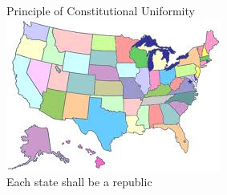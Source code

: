 \begin{frame}{Principle of Constitutional Uniformity}
    \centering
    \includegraphics[height=.7\textheight]{img/us-map.png} \\
    \huge{Each state shall be a republic} \\
\end{frame}


